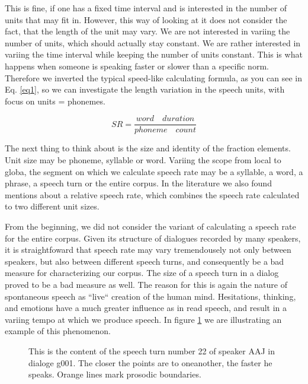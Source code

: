 \documentclass[11pt,a4paper]{scrbook}
\begin{document}
This is fine, if one has a fixed time interval and is interested in the number of units that may fit in. However, this way of looking at it does not consider the fact, that the length of the unit may vary. We are not interested in variing the number of units, which should actually stay constant. We are rather interested in variing the time interval while keeping the number of units constant. This is what happens when someone is speaking faster or slower than a specific norm. Therefore we inverted the typical speed-like calculating formula, as you can see in Eq. \ref{eq1}, so we can investigate the length variation in the speech units, with focus on units = phonemes.

\begin{equation}
\label{eq1}
	SR = \frac{word \quad duration}{phoneme\quad count}
\end{equation}

The next thing to think about is the size and identity of the fraction elements. Unit size may be phoneme, syllable or word. Variing the scope from local to globa, the segment on which we calculate speech rate may be a syllable, a word, a phrase, a speech turn or the entire corpus. In the literature \cite{Pfitzinger1998} we also found mentions about a relative speech rate, which combines the speech rate calculated to two different unit sizes.

From the beginning, we did not consider the variant of calculating a speech rate for the entire corpus. Given its structure of dialogues recorded by many speakers, it is straightfoward that speech rate may vary tremendousely not only between speakers, but also between different speech turns, and consequently be a bad measure for characterizing our corpus. The size of a speech turn in a dialog proved to be a bad measure as well. The reason for this is again the nature of spontaneous speech as ``live`` creation of the human mind. Hesitations, thinking, and emotions have a much greater influence as in read speech, and result in a variing tempo at which we produce speech. In figure \ref{fig:SR_example} we are illustrating an example of this phenomenon.

\begin{figure}[htbp]
	\centering
	\noindent{}
	\vspace{-25mm}
	\caption[Example of speech rate variation inside a turn]{This is the content of the speech turn number 22 of speaker AAJ in dialoge g001. The closer the points are to oneanother, the faster he speaks. Orange lines mark prosodic boundaries.}
	\label{fig:SR_example}
\end{figure}
\end{document}
